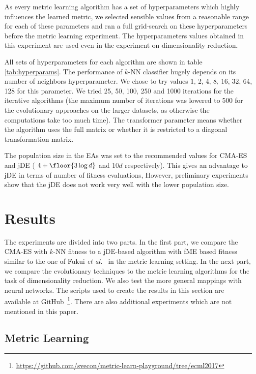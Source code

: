 As every metric learning algorithm has a set of hyperparameters which highly influences the learned metric, we selected sensible values from a reasonable range for each of these parameters and ran a full grid-search on these hyperparameters before the metric learning experiment. The hyperparameters values obtained in this experiment are used even in the experiment on dimensionality reduction.

All sets of hyperparameters for each algorithm are shown in table \ref{tab:hyperparams}. The performance of $k$-NN classifier hugely depends on its number of neighbors hyperparameter. We chose to try values 1, 2, 4, 8, 16, 32, 64, 128 for this parameter. We tried 25, 50, 100, 250 and 1000 iterations for the iterative algorithms (the maximum number of iterations was lowered to 500 for the evolutionary approaches on the larger datasets, as otherwise the computations take too much time). The transformer parameter means whether the algorithm uses the full matrix or whether it is restricted to a diagonal transformation matrix.

The population size in the EAs was set to the recommended values for CMA-ES and jDE ( $4+\floor{3\log{d}}$ and $10d$ respectively). This gives an advantage to jDE in terms of number of fitness evaluations, However, preliminary experiments show that the jDE does not work very well with the lower population size.

\section{Results}
The experiments are divided into two parts. In the first part, we compare the CMA-ES with $k$-NN fitness to a jDE-based algorithm with fME based fitness similar to the one of Fukui \emph{et al.}~\cite{fukui2013evolutionary} in the metric learning setting. In the next part, we compare the evolutionary techniques to the metric learning algorithms for the task of dimensionality reduction. We also test the more general mappings with neural networks. The scripts used to create the results in this section are available at GitHub~\footnote{\url{https://github.com/svecon/metric-learn-playground/tree/ecml2017}}. There are also additional experiments which are not mentioned in this paper.




\subsection{Metric Learning}
\label{chap:exp:classification}

